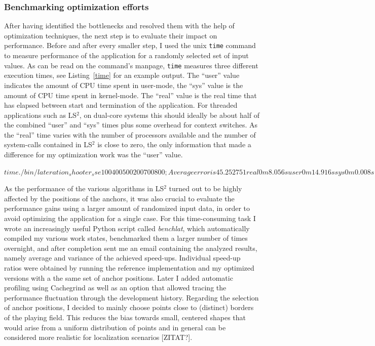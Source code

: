 \subsubsection{Benchmarking optimization efforts}
\label{benchmarking}
After having identified the bottlenecks and resolved them with the help of optimization techniques, the next step is to evaluate their impact on performance. Before and after every smaller step, I used the unix \texttt{time} command to measure performance of the application for a randomly selected set of input values. As can be read on the command's manpage, \texttt{time} measures three different execution times, see Listing~\ref{time} for an example output. The ``user'' value indicates the amount of CPU time spent in user-mode, the ``sys'' value is the amount of CPU time spent in kernel-mode. The ``real'' value is the real time that has elapsed between start and termination of the application. For threaded applications such as LS$^{2}$, on dual-core systems this should ideally be about half of the combined ``user'' and ``sys'' times plus some overhead for context switches. As the ``real'' time varies with the number of processors available and the number of system-calls contained in LS$^{2}$ is close to zero, the only information that made a difference for my optimization work was the ``user'' value.

\begin{shell}[caption={Example output of the unix \texttt{time} command},label=time]
$ time { ./bin/lateration_shooter_sse 100 400 500 200 700 800 ; }
Average error is 45.252751

real    0m8.056s
user    0m14.916s
sys     0m0.008s
$
\end{shell}

As the performance of the various algorithms in LS$^{2}$ turned out to be highly affected by the positions of the anchors, it was also crucial to evaluate the performance gains using a larger amount of randomized input data, in order to avoid optimizing the application for a single case. For this time-consuming task I wrote an increasingly useful Python script called \emph{benchlat}, which automatically compiled my various work states, benchmarked them a larger number of times overnight, and after completion sent me an email containing the analyzed results, namely average and variance of the achieved speed-ups. Individual speed-up ratios were obtained by running the reference implementation and my optimized versions with a the same set of anchor positions. Later I added automatic profiling using Cachegrind as well as an option that allowed tracing the performance fluctuation through the development history. Regarding the selection of anchor positions, I decided to mainly choose points close to (distinct) borders of the playing field. This reduces the bias towards small, centered shapes that would arise from a uniform distribution of points and in general can be considered more realistic for localization scenarios [ZITAT?].

